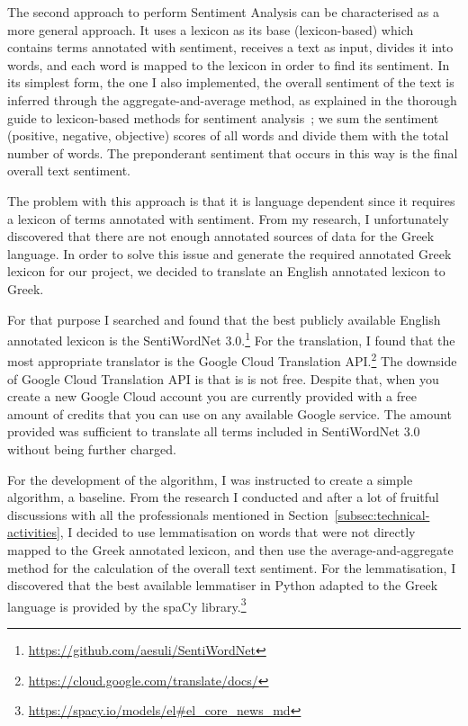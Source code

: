 The second approach to perform Sentiment Analysis
can be characterised as a more general approach.
It uses a lexicon as its base (lexicon-based)
which contains terms annotated with sentiment,
receives a text as input, divides it into words,
and each word is mapped to the lexicon
in order to find its sentiment.
In its simplest form, the one I also implemented,
the overall sentiment of the text is inferred
through the aggregate-and-average method,
as explained in the thorough guide
to lexicon-based methods for sentiment analysis~\cite{TBTV11};
we sum the sentiment (positive, negative, objective) scores
of all words and divide them with the total number of words.
The preponderant sentiment that occurs in this way
is the final overall text sentiment.

The problem with this approach is that it is language dependent
since it requires a lexicon of terms annotated with sentiment.
From my research, I unfortunately discovered that there are
not enough annotated sources of data for the Greek language.
In order to solve this issue
and generate the required annotated Greek lexicon for our project,
we decided to translate an English annotated lexicon to Greek.

For that purpose I searched and found
that the best publicly available English annotated lexicon
is the SentiWordNet 3.0.\footnote{\url {https://github.com/aesuli/SentiWordNet}}
For the translation, I found that the most appropriate translator
is the Google Cloud Translation API.\footnote{\url {https://cloud.google.com/translate/docs/}}
The downside of Google Cloud Translation API is
that is is not free.
Despite that, when you create a new Google Cloud account
you are currently provided with a free amount of credits
that you can use on any available Google service.
The amount provided was sufficient to translate all terms
included in SentiWordNet 3.0 without being further charged.

For the development of the algorithm,
I was instructed to create a simple algorithm, a baseline.
From the research I conducted and after a lot of fruitful discussions
with all the professionals mentioned
in Section~\ref{subsec:technical-activities},
I decided to use lemmatisation on words that were not directly mapped
to the Greek annotated lexicon,
and then use the average-and-aggregate method
for the calculation of the overall text sentiment.
For the lemmatisation, I discovered
that the best available lemmatiser in Python
adapted to the Greek language is provided
by the spaCy library.\footnote{\url {https://spacy.io/models/el#el_core_news_md}}

